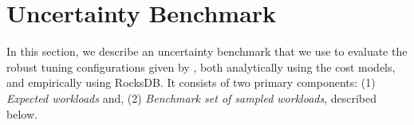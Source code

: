 
\section{Uncertainty Benchmark}
\label{sec:uncertainty-benchmark}

In this section, we describe an uncertainty benchmark that we use to evaluate
    the robust tuning configurations given by \Endure, both analytically using
    the cost models, and empirically using RocksDB.
It consists of two primary components: (1) \emph{Expected workloads} and,
    (2) \emph{Benchmark set of sampled workloads}, described below.

